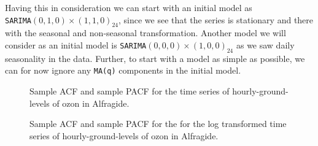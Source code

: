\documentclass{article}
\begin{document}
Having this in consideration we can start with an initial model as \\
\verb|SARIMA|$(0,1,0) \times (1,1,0)_{24}$, since we see that the series is stationary and there with the seasonal and non-seasonal transformation. Another model we will consider as an initial model is \verb|SARIMA|$(0,0,0) \times (1,0,0)_{24}$ as we saw daily seasonality in the data. Further, to start with a model as simple as
possible, we can for now ignore any \verb|MA(q)| components in the initial model. 

\begin{figure}[ht!]
   \centering
   \caption{Sample ACF and sample PACF for the
   time series of hourly-ground-levels of ozon  in Alfragide.}
    \label{fig:acf}
\end{figure}

\begin{figure}[ht!]
   \centering
   \caption{Sample ACF and sample PACF for the for the
   log transformed time series of hourly-ground-levels of ozon in Alfragide.}
    \label{fig:acflog}
\end{figure}
\end{document}
